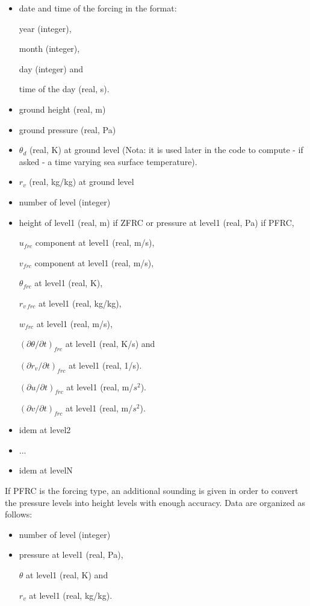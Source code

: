 \begin{itemize}
\item date and time of the forcing in the format:

year (integer),

month (integer),

day (integer) and

time of the day (real, s).
\item ground height (real, m)
\item ground pressure (real, Pa) 
\item $\theta_d$ (real, K) at ground level (Nota: it is used later in
the code to compute - if asked - a time varying sea surface temperature).
\item $r_v$ (real, kg/kg) at ground level
\item number of level (integer)
\item height of level1 (real, m) if ZFRC or pressure at level1 (real, Pa) if
PFRC,

$u_{frc}$ component at level1 (real, m/s),

$v_{frc}$ component at level1 (real, m/s),

$\theta_{frc}$ at level1 (real, K),

$r_{v\ frc}$ at level1 (real, kg/kg),

$w_{frc}$ at level1 (real, m/s),

$(\partial\theta / \partial t)_{frc}$ at level1 (real, K/s) and

$(\partial r_v/ \partial t)_{frc}$ at level1 (real, 1/s).

$(\partial u/ \partial t)_{frc}$ at level1 (real, m/$s^2$).

$(\partial v/ \partial t)_{frc}$ at level1 (real, m/$s^2$).

\item idem at level2
\item   ...
\item idem at levelN
\end{itemize}

If PFRC is the forcing type, an additional sounding is given in order to
convert the pressure levels into height levels with enough accuracy. Data
are organized as follows:

\begin{itemize}
\item number of level (integer)
\item pressure at level1 (real, Pa),

$\theta$ at level1 (real, K) and

$r_{v}$ at level1 (real, kg/kg).
\end{itemize}

